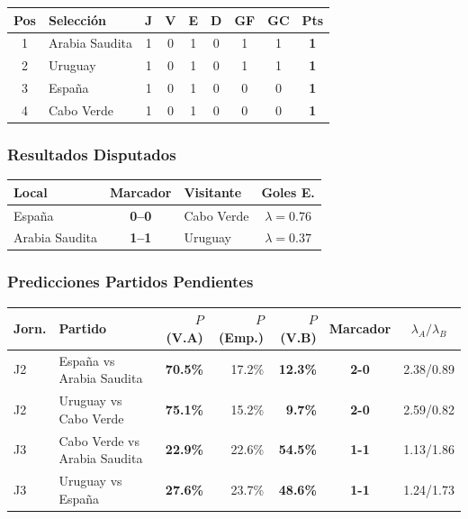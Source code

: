 \documentclass[11pt,a4paper]{article}
\newcommand{\prob}[1]{\textbf{#1\%}}
\begin{document}
\begin{center}
\begin{tabular}{@{}clccccccc@{}}
\toprule
\textbf{Pos} & \textbf{Selección} & \textbf{J} & \textbf{V} & \textbf{E} & \textbf{D} & \textbf{GF} & \textbf{GC} & \textbf{Pts} \\
\midrule
  \cellcolor{green!25}1 & \cellcolor{green!25}Arabia Saudita & 1 & 0 & 1 & 0 & 1 & 1 & \textbf{1} \\
  \cellcolor{green!25}2 & \cellcolor{green!25}Uruguay & 1 & 0 & 1 & 0 & 1 & 1 & \textbf{1} \\
  \cellcolor{yellow!20}3 & \cellcolor{yellow!20}España & 1 & 0 & 1 & 0 & 0 & 0 & \textbf{1} \\
  4 & Cabo Verde & 1 & 0 & 1 & 0 & 0 & 0 & \textbf{1} \\
\bottomrule
\end{tabular}
\end{center}

\subsubsection*{Resultados Disputados}

\begin{center}
\begin{tabular}{@{}lclc@{}}
\toprule
\textbf{Local} & \textbf{Marcador} & \textbf{Visitante} & \textbf{Goles E.} \\
\midrule
  España & \textbf{0--0} & Cabo Verde & $\lambda=0.76$ \\
  Arabia Saudita & \textbf{1--1} & Uruguay & $\lambda=0.37$ \\
\bottomrule
\end{tabular}
\end{center}

\subsubsection*{Predicciones Partidos Pendientes}


\begin{center}
\begin{tabular}{@{}llrrrcc@{}}
\toprule
\textbf{Jorn.} & \textbf{Partido} & \textbf{$P$(V.A)} & \textbf{$P$(Emp.)} & \textbf{$P$(V.B)} & \textbf{Marcador} & \textbf{$\lambda_A/\lambda_B$} \\
\midrule
  J2 & España vs Arabia Saudita & \cellcolor{green!20}\prob{70.5} & 17.2\% & \cellcolor{red!15}\prob{12.3} & \textbf{2-0} & 2.38/0.89 \\
  J2 & Uruguay vs Cabo Verde & \cellcolor{green!20}\prob{75.1} & 15.2\% & \cellcolor{red!15}\prob{9.7} & \textbf{2-0} & 2.59/0.82 \\
  J3 & Cabo Verde vs Arabia Saudita & \cellcolor{red!15}\prob{22.9} & 22.6\% & \cellcolor{yellow!30}\prob{54.5} & \textbf{1-1} & 1.13/1.86 \\
  J3 & Uruguay vs España & \cellcolor{red!15}\prob{27.6} & 23.7\% & \cellcolor{yellow!30}\prob{48.6} & \textbf{1-1} & 1.24/1.73 \\
\bottomrule
\end{tabular}
\end{center}
\end{document}
